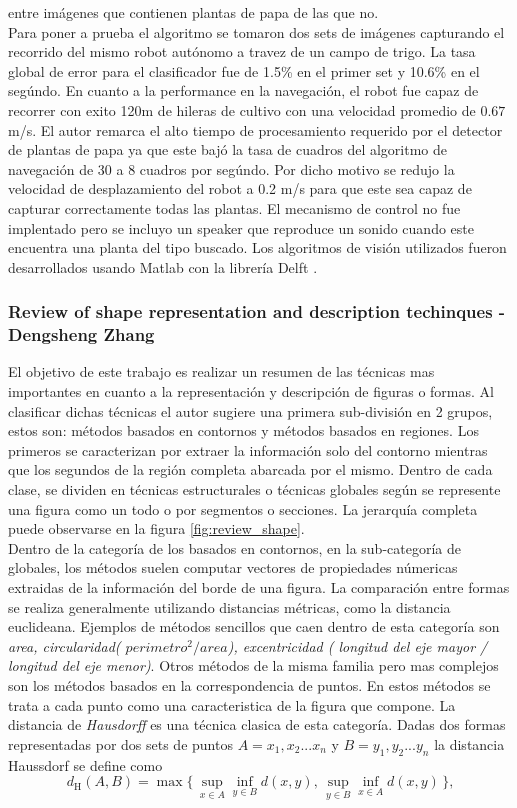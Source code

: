 	 entre imágenes que contienen plantas de papa de las que no.\\
	 \indent Para poner a prueba el algoritmo se tomaron dos sets de 
	 imágenes capturando el recorrido del mismo robot autónomo a 
	 travez de un campo de trigo. La tasa global de error para el 
	 clasificador fue de 1.5\% en el primer set y 10.6\% en el 
	 segúndo. En cuanto a la performance en la navegación, el robot 
	 fue capaz de recorrer con exito 120m de hileras de cultivo con 
	 una velocidad promedio de $0.67$ m/s. El autor remarca el alto 
	 tiempo de procesamiento requerido por el detector de plantas de 
	 papa ya que este bajó la tasa de cuadros del algoritmo de 
	 navegación de 30 a 8 cuadros por segúndo. Por dicho motivo se 
	 redujo la velocidad de desplazamiento del robot a 0.2 m/s para 
	 que este sea capaz de capturar correctamente todas las plantas. 
	 El mecanismo de control no fue implentado pero se incluyo un 
	 speaker que reproduce un sonido cuando este encuentra una planta 
	 del tipo buscado. Los algoritmos de visión utilizados fueron 
	 desarrollados usando Matlab con la librería Delft \cite{DipLib}.
	 
	\subsubsection{Review of shape representation and description techinques - Dengsheng Zhang}
El objetivo de este trabajo es realizar un resumen de las técnicas mas 
importantes en cuanto a la representación y descripción de figuras o 
formas.
Al clasificar dichas técnicas el autor sugiere una primera sub-división en 2 grupos, estos son: métodos basados en contornos y métodos basados 
en regiones. Los primeros se caracterizan por extraer  la información solo del contorno mientras que los segundos de la región completa abarcada
por el mismo. Dentro de cada clase, se dividen en técnicas 
estructurales o técnicas globales según  se represente una figura como un todo o 
por segmentos o secciones. La jerarquía completa puede observarse en la figura \ref{fig:review_shape}.\\
\indent Dentro de la categoría de los basados en contornos, en la sub-categoría de globales, los métodos suelen computar vectores de 
propiedades númericas extraidas de la información del borde de una 
figura. La comparación entre formas se realiza 
generalmente utilizando distancias métricas, como la distancia euclideana. Ejemplos de métodos sencillos que caen dentro de esta 
categoría son \textit{area, circularidad( $perimetro^2 / area$), 
excentricidad ( longitud del eje mayor / longitud del eje menor)}. Otros métodos 
de la misma familia pero mas complejos son los métodos basados en la correspondencia de puntos. En estos métodos se trata a cada punto como una 
caracteristica de la figura que compone. La distancia de \textit{ Hausdorff} es una técnica clasica de esta categoría. Dadas dos formas representadas
por dos sets de puntos $A={x_1,x_2...x_n}$ y $B={y_1,y_2...y_n}$ la distancia Haussdorf se define como 
\[
	 d_{\mathrm H}(A,B) = \max\{\,\sup_{x \in A} \inf_{y \in B} d(x,y),\, \sup_{y \in B} \inf_{x \in A} d(x,y)\,\}\mbox{,}
\] 


